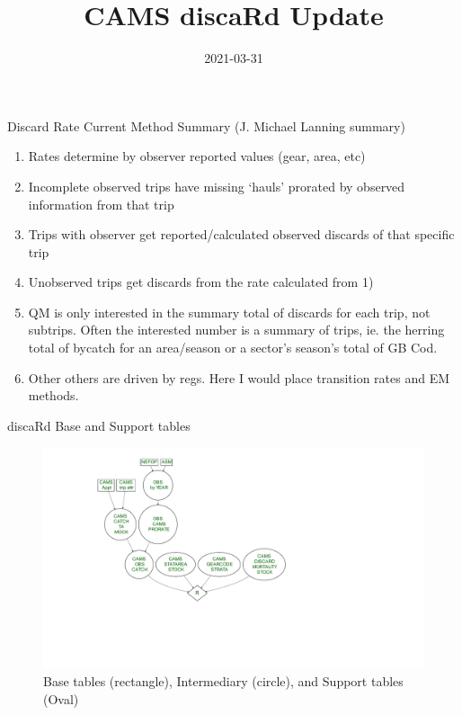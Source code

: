 \documentclass[
  ignorenonframetext,
]{beamer}
\title{CAMS discaRd Update}
\author{Ben Galuardi \& Dan Linden \and \footnote<.->{APSD}}
\date{2021-03-31}
\providecommand{\tightlist}{%
  \setlength{\itemsep}{0pt}\setlength{\parskip}{0pt}}
\begin{document}
\frame{\titlepage}

\begin{frame}{Discard Rate Current Method Summary (J. Michael Lanning
summary)}
\protect\hypertarget{discard-rate-current-method-summary-j.-michael-lanning-summary}{}

\begin{enumerate}
\tightlist
\item
  Rates determine by observer reported values (gear, area, etc)
\item
  Incomplete observed trips have missing `hauls' prorated by observed
  information from that trip
\item
  Trips with observer get reported/calculated observed discards of that
  specific trip
\item
  Unobserved trips get discards from the rate calculated from 1)
\item
  QM is only interested in the summary total of discards for each trip,
  not subtrips. Often the interested number is a summary of trips, ie.
  the herring total of bycatch for an area/season or a sector's season's
  total of GB Cod.
\item
  Other others are driven by regs. Here I would place transition rates
  and EM methods.
\end{enumerate}

\end{frame}

\begin{frame}{discaRd Base and Support tables}
\protect\hypertarget{discard-base-and-support-tables}{}

\begin{figure}
\centering
\includegraphics{discard_documention_beamer_files/figure-beamer/table_flow0-1.pdf}
\caption{Base tables (rectangle), Intermediary (circle), and Support
tables (Oval)}
\end{figure}

\end{frame}
\end{document}
